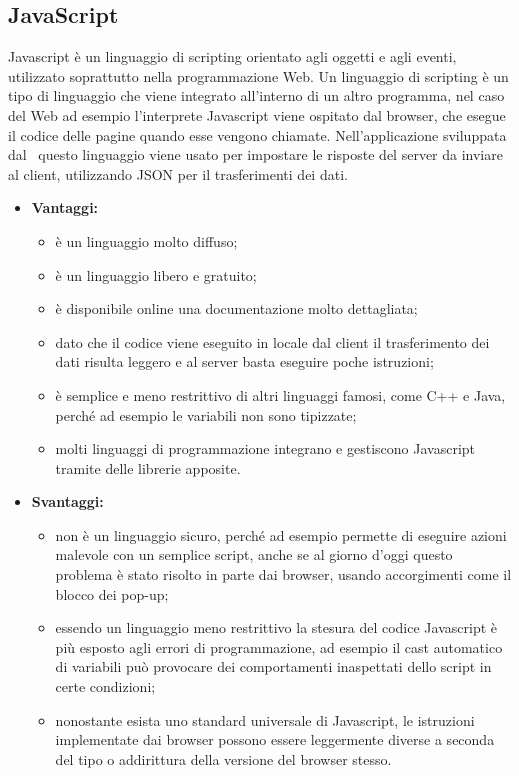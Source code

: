 \subsection{JavaScript}

	Javascript è un linguaggio di scripting orientato agli oggetti e agli eventi, utilizzato soprattutto nella programmazione Web. Un linguaggio di scripting è un tipo di linguaggio che viene integrato all'interno di un altro programma, nel caso del Web ad esempio l'interprete Javascript viene ospitato dal browser, che esegue il codice delle pagine quando esse vengono chiamate. Nell'applicazione sviluppata dal \ questo linguaggio viene usato per impostare le risposte del server da inviare al client, utilizzando JSON per il trasferimenti dei dati.		

	\begin{itemize}
		\item \textbf{Vantaggi:}
			\begin{itemize}
				\item è un linguaggio molto diffuso;
				\item è un linguaggio libero e gratuito;
				\item è disponibile online una documentazione molto dettagliata;
				\item dato che il codice viene eseguito in locale dal client il trasferimento dei dati risulta leggero e al server basta eseguire poche istruzioni;
				\item è semplice e meno restrittivo di altri linguaggi famosi, come C++ e Java, perché ad esempio le variabili non sono tipizzate;
				\item molti linguaggi di programmazione integrano e gestiscono Javascript tramite delle librerie apposite.
			\end{itemize}
		\item \textbf{Svantaggi:}
			\begin{itemize}
				\item non è un linguaggio sicuro, perché ad esempio permette di eseguire azioni malevole con un semplice script, anche se al giorno d'oggi questo problema è stato risolto in parte dai browser, usando accorgimenti come il blocco dei pop-up;
				\item essendo un linguaggio meno restrittivo la stesura del codice Javascript è più esposto agli errori di programmazione, ad esempio il cast automatico di variabili può provocare dei comportamenti inaspettati dello script in certe condizioni;
				\item nonostante esista uno standard universale di Javascript, le istruzioni implementate dai browser possono essere leggermente diverse a seconda del tipo o addirittura della versione del browser stesso.
			\end{itemize}
	\end{itemize}

